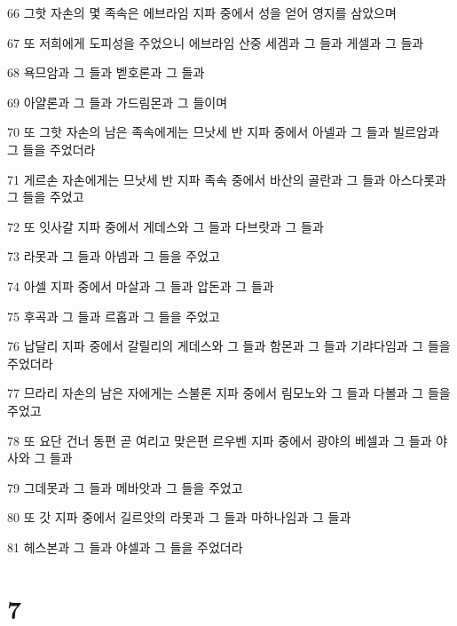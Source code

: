 \par 66 그핫 자손의 몇 족속은 에브라임 지파 중에서 성을 얻어 영지를 삼았으며
\par 67 또 저희에게 도피성을 주었으니 에브라임 산중 세겜과 그 들과 게셀과 그 들과
\par 68 욕므암과 그 들과 벧호론과 그 들과
\par 69 아얄론과 그 들과 가드림몬과 그 들이며
\par 70 또 그핫 자손의 남은 족속에게는 므낫세 반 지파 중에서 아넬과 그 들과 빌르암과 그 들을 주었더라
\par 71 게르손 자손에게는 므낫세 반 지파 족속 중에서 바산의 골란과 그 들과 아스다롯과 그 들을 주었고
\par 72 또 잇사갈 지파 중에서 게데스와 그 들과 다브랏과 그 들과
\par 73 라못과 그 들과 아넴과 그 들을 주었고
\par 74 아셀 지파 중에서 마살과 그 들과 압돈과 그 들과
\par 75 후곡과 그 들과 르홉과 그 들을 주었고
\par 76 납달리 지파 중에서 갈릴리의 게데스와 그 들과 함몬과 그 들과 기랴다임과 그 들을 주었더라
\par 77 므라리 자손의 남은 자에게는 스불론 지파 중에서 림모노와 그 들과 다볼과 그 들을 주었고
\par 78 또 요단 건너 동편 곧 여리고 맞은편 르우벤 지파 중에서 광야의 베셀과 그 들과 야사와 그 들과
\par 79 그데못과 그 들과 메바앗과 그 들을 주었고
\par 80 또 갓 지파 중에서 길르앗의 라못과 그 들과 마하나임과 그 들과
\par 81 헤스본과 그 들과 야셀과 그 들을 주었더라

\chapter{7}

